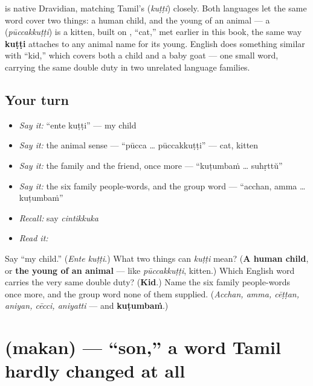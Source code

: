 \begin{cousinweb}
\textbf{} is native Dravidian, matching Tamil's \textbf{} (\emph{kuṭṭi}) closely. Both languages let the same word cover two things: a human child, and the young of an animal — a \textbf{} (\emph{pūccakkuṭṭi}) is a kitten, built on \textbf{}, \textquotedblleft{}cat,\textquotedblright{} met earlier in this book, the same way \textbf{kuṭṭi} attaches to any animal name for its young. English does something similar with \textquotedblleft{}kid,\textquotedblright{} which covers both a child and a baby goat — one small word, carrying the same double duty in two unrelated language families.
\end{cousinweb}

\subsection*{Your turn}
\begin{itemize}
\raggedright
  \item \emph{Say it:} \textquotedblleft{}ente kuṭṭi\textquotedblright{} — my child
  \item \emph{Say it:} the animal sense — \textquotedblleft{}pūcca … pūccakkuṭṭi\textquotedblright{} — cat, kitten
  \item \emph{Say it:} the family and the friend, once more — \textquotedblleft{}kuṭumbaṁ … suhṛttŭ\textquotedblright{}
  \item \emph{Say it:} the six family people-words, and the group word — \textquotedblleft{}acchan, amma … kuṭumbaṁ\textquotedblright{}
  \item \emph{Recall:} say \emph{cintikkuka}
  \item \emph{Read it:} \textbf{}
\end{itemize}

\begin{tcolorbox}[breakable,colback=teal!4,colframe=teal!35!black,title={Before you move on}]
Say \textquotedblleft{}my child.\textquotedblright{} (\emph{Ente kuṭṭi}.) What two things can \emph{kuṭṭi} mean? (\textbf{A human child}, or \textbf{the young of an animal} — like \emph{pūccakkuṭṭi}, kitten.) Which English word carries the very same double duty? (\textbf{Kid}.) Name the six family people-words once more, and the group word none of them supplied. (\emph{Acchan, amma, cēṭṭan, aniyan, cēcci, aniyatti} — and \textbf{kuṭumbaṁ}.)
\end{tcolorbox}
\section[\texorpdfstring{\ml{മകൻ} (makan)}{മകൻ (makan)}]{ (makan) — \textquotedblleft{}son,\textquotedblright{} a word Tamil hardly changed at all}

